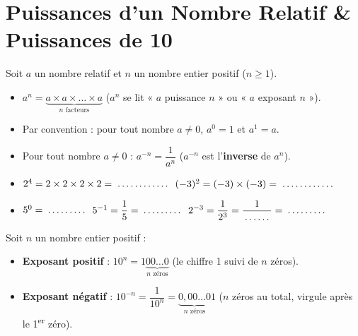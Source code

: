 \section{Puissances d'un Nombre Relatif \& Puissances de 10}

\begin{cadredef}
Soit $a$ un nombre relatif et $n$ un nombre entier positif ($n \geq 1$).
\begin{itemize}
    \item $a^n = \underbrace{a \times a \times \dots \times a}_{n \text{ facteurs}}$ \quad ($a^n$ se lit « $a$ puissance $n$ » ou « $a$ exposant $n$ »).
    \item Par convention : pour tout nombre $a \neq 0$, \textbf{$a^0 = 1$} \quad et \quad \textbf{$a^1 = a$}.
    \item Pour tout nombre $a \neq 0$ : \textbf{$a^{-n} = \dfrac{1}{a^n}$} \quad ($a^{-n}$ est l'\textbf{inverse} de $a^n$).
\end{itemize}
\end{cadredef}

\begin{cadreexemple}
\begin{itemize}
    \item $2^4 = 2 \times 2 \times 2 \times 2 = \pointille[2cm]$ \hfill $(-3)^2 = (-3) \times (-3) = \pointille[2cm]$
    \item $5^0 = \pointille[1.5cm]$ \hfill $5^{-1} = \dfrac{1}{5} = \pointille[1.5cm]$ \hfill $2^{-3} = \dfrac{1}{2^3} = \dfrac{1}{\pointille[1cm]} = \pointille[1.5cm]$
\end{itemize}
\end{cadreexemple}

\begin{cadreprop}
Soit $n$ un nombre entier positif :
\begin{itemize}
    \item \textbf{Exposant positif} : $10^n = 1\underbrace{00\dots0}_{n\text{ zéros}}$ \quad (le chiffre 1 suivi de $n$ zéros).
    \item \textbf{Exposant négatif} : $10^{-n} = \dfrac{1}{10^n} = \underbrace{0{,}00\dots0}_{n\text{ zéros}}1$ \quad ($n$ zéros au total, virgule après le 1\textsuperscript{er} zéro).
\end{itemize}
\end{cadreprop}

